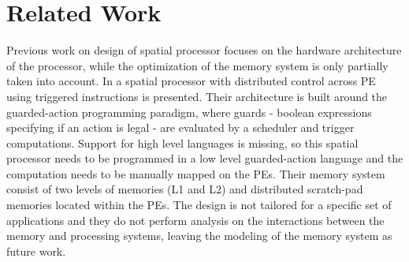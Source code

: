 
\section{Related Work}






Previous work on design of spatial processor focuses on the hardware architecture of the processor, while the optimization of the memory system is only partially taken into account.
In \cite{parashar2014efficient} a spatial processor with distributed control across PE using triggered instructions is presented. Their architecture is built around the guarded-action programming paradigm, where guards - boolean expressions specifying if an action is legal - are evaluated by a scheduler and trigger computations. Support for high level languages is missing, so this spatial processor needs to be programmed in a low level guarded-action language and the computation needs to be manually mapped on the PEs. Their memory system consist of two levels of memories (L1 and L2) and distributed scratch-pad memories located within the PEs. The design is not tailored for a specific set of applications and they do not perform analysis on the interactions between the memory and processing systems, leaving the modeling of the memory system as future work.

